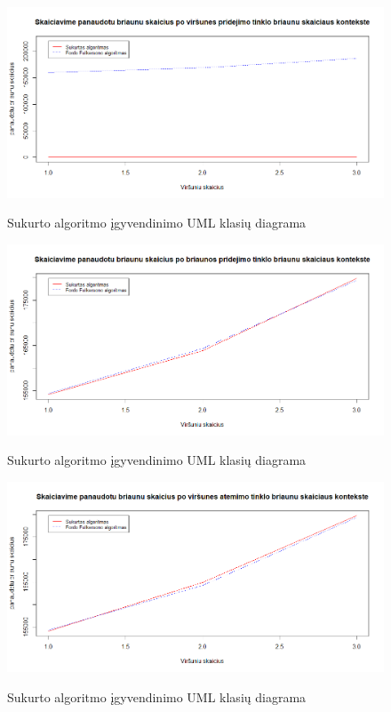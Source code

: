 \begin{figure}[H]
	\caption{Sukurto algoritmo įgyvendinimo UML klasių diagrama}
	\centering
	\includegraphics[width=\textwidth]{img/eav.png}
	\label{plot:eav}
\end{figure}
\begin{figure}[H]
	\caption{Sukurto algoritmo įgyvendinimo UML klasių diagrama}
	\centering
	\includegraphics[width=\textwidth]{img/eae.png}
	\label{plot:eae}
\end{figure}
\begin{figure}[H]
	\caption{Sukurto algoritmo įgyvendinimo UML klasių diagrama}
	\centering
	\includegraphics[width=\textwidth]{img/erv.png}
	\label{plot:erv}
\end{figure}
